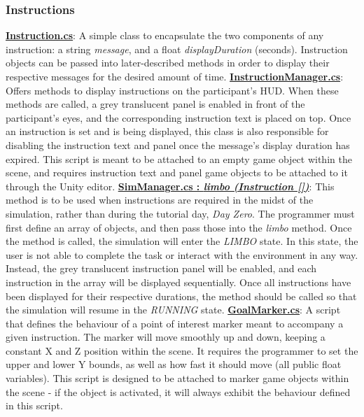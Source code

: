 \documentclass{article}
\begin{document}
\subsubsection*{Instructions} 
\href{https://bit.ly/2JFHEED}{\textbf{Instruction.cs}}: A simple class to encapsulate the two components of any instruction: a string \textit{message}, and a float \textit{displayDuration} (seconds). Instruction objects can be passed into later-described methods in order to display their respective messages for the desired amount of time. \newline \newline
\href{https://bit.ly/2TzLE9i}{\textbf{InstructionManager.cs}}: Offers methods to display instructions on the participant's HUD. When these methods are called, a grey translucent panel is enabled in front of the participant's eyes, and the corresponding instruction text is placed on top. Once an instruction is set and is being displayed, this class is also responsible for disabling the instruction text and panel once the message's display duration has expired. This script is meant to be attached to an empty game object within the scene, and requires instruction text and panel game objects to be attached to it through the Unity editor. \newline \newline
\href{https://bit.ly/2UhmSzq}{\textbf{SimManager.cs : \textit{limbo (Instruction [])}}}: This method is to be used when instructions are required in the midst of the simulation, rather than during the tutorial day, \textit{Day Zero}. The programmer must first define an array of  objects, and then pass those into the \textit{limbo} method. Once the method is called, the simulation will enter the \textit{LIMBO} state. In this state, the user is not able to complete the task or interact with the environment in any way. Instead, the grey translucent instruction panel will be enabled, and each instruction in the array will be displayed sequentially. Once all instructions have been displayed for their respective durations, the  method should be called so that the simulation will resume in the \textit{RUNNING} state. \newline \newline
\href{https://bit.ly/2Yooc2m}{\textbf{GoalMarker.cs}}: A script that defines the behaviour of a point of interest marker meant to accompany a given instruction. The marker will move smoothly up and down, keeping a constant X and Z position within the scene. It requires the programmer to set the upper and lower Y bounds, as well as how fast it should move (all public float variables). This script is designed to be attached to marker game objects within the scene - if the object is activated, it will always exhibit the behaviour defined in this script. \newline \newline
\end{document}
